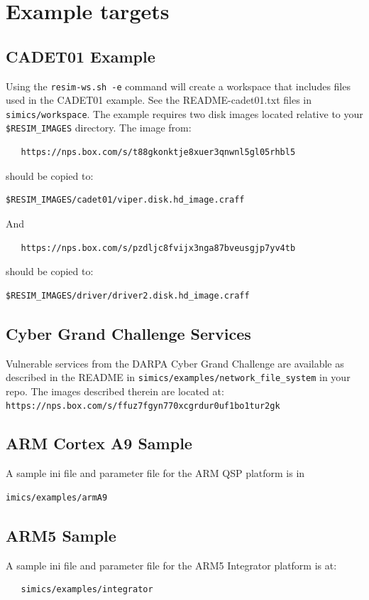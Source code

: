 \documentclass[titlepage]{article}
\begin{document}
\section{Example targets}
\label{example-targets}
\subsection{CADET01 Example}
Using the {\tt resim-ws.sh -e} command will create a workspace that includes files used in the CADET01 example.
See the README-cadet01.txt files in {\tt simics/workspace}.
The example requires two disk images located relative to your {\tt \$RESIM\_IMAGES} directory.  The image from: 
\begin{verbatim}
   https://nps.box.com/s/t88gkonktje8xuer3qnwnl5gl05rhbl5
\end{verbatim}
\noindent should be copied to:
\begin{verbatim}
$RESIM_IMAGES/cadet01/viper.disk.hd_image.craff
\end{verbatim}
And
\begin{verbatim}
   https://nps.box.com/s/pzdljc8fvijx3nga87bveusgjp7yv4tb
\end{verbatim}
\noindent should be copied to:
\begin{verbatim}
$RESIM_IMAGES/driver/driver2.disk.hd_image.craff
\end{verbatim}

\subsection{Cyber Grand Challenge Services}
Vulnerable services from the DARPA Cyber Grand Challenge are available as described in the
README in {\tt simics/examples/network\_file\_system} in your repo.
The images described therein are located at: 
\newline
{\tt https://nps.box.com/s/ffuz7fgyn770xcgrdur0uf1bo1tur2gk}

\subsection{ARM Cortex A9 Sample}
A sample ini file and parameter file for the ARM QSP platform is in 
\begin{verbatim}
imics/examples/armA9
\end{verbatim}

\subsection{ARM5 Sample}
A sample ini file and parameter file for the ARM5 Integrator platform is at:
\begin{verbatim}
   simics/examples/integrator
\end{verbatim}
\end{document}
